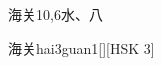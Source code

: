 \begin{entry}{海关}{10,6}{⽔、⼋}
  \begin{phonetics}{海关}{hai3guan1}[][HSK 3]
  \end{phonetics}
\end{entry}
